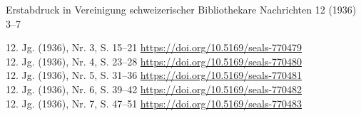 Erstabdruck in Vereinigung schweizerischer Bibliothekare Nachrichten 12
(1936) 3--7

12. Jg. (1936), Nr. 3, S. 15--21
\url{https://doi.org/10.5169/seals-770479}\\
12. Jg. (1936), Nr. 4, S. 23--28
\url{https://doi.org/10.5169/seals-770480}\\
12. Jg. (1936), Nr. 5, S. 31--36
\href{https://doi.org/10.5169/seals-770480}{https://doi.org/10.5169/seals-770481}\\
12. Jg. (1936), Nr. 6, S. 39--42
\url{https://doi.org/10.5169/seals-770482}\\
12. Jg. (1936), Nr. 7, S. 47--51
\href{https://doi.org/10.5169/seals-770482}{https://doi.org/10.5169/seals-770483}
